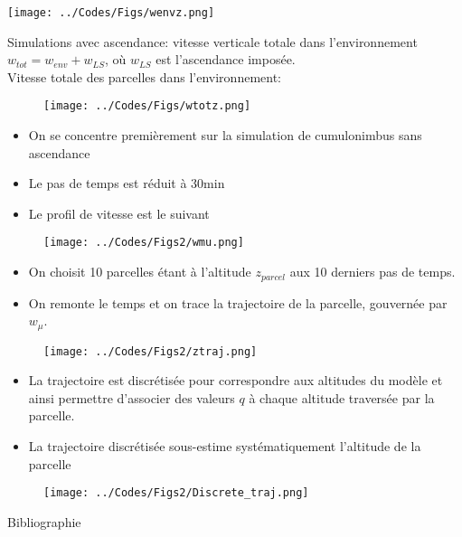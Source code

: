 \documentclass[10pt]{beamer}
\begin{document}
\begin{frame}{\secname}
    \centering
    \texttt{[image: ../Codes/Figs/wenvz.png]}
\end{frame}

\begin{frame}{\secname}
    Simulations avec ascendance: vitesse verticale totale dans l'environnement $w_{tot} = w_{env} + w_{LS}$, où $w_{LS}$ est l'ascendance imposée. \\
    Vitesse totale des parcelles dans l'environnement:
    
    \begin{figure}[hbtp]
        \centering
        \texttt{[image: ../Codes/Figs/wtotz.png]}
    \end{figure}
\end{frame}

\begin{frame}{\secname}
    \begin{itemize}
        \item On se concentre premièrement sur la simulation de cumulonimbus sans ascendance
        \item Le pas de temps est réduit à 30min
        \item Le profil de vitesse est le suivant
    \end{itemize}
    \begin{figure}[hbtp]
        \centering
        \texttt{[image: ../Codes/Figs2/wmu.png]}
    \end{figure}
\end{frame}

\begin{frame}{\secname}
    \begin{itemize}
        \item On choisit 10 parcelles étant à l'altitude $z_{parcel}$ aux 10 derniers pas de temps. 
        \item On remonte le temps et on trace la trajectoire de la parcelle, gouvernée par $w_{\mu}$.
    \end{itemize}
    \begin{figure}[hbtp]
        \centering
        \texttt{[image: ../Codes/Figs2/ztraj.png]}
    \end{figure}
\end{frame}

\begin{frame}{\secname}
    \begin{itemize}
        \item La trajectoire est discrétisée pour correspondre aux altitudes du modèle et ainsi permettre d'associer des valeurs $q$ à chaque altitude traversée par la parcelle. 
        \item La trajectoire discrétisée sous-estime systématiquement l'altitude de la parcelle
    \end{itemize}
    \begin{figure}[hbtp]
        \centering
        \texttt{[image: ../Codes/Figs2/Discrete\_traj.png]}
    \end{figure}
\end{frame}

\begin{frame}{Bibliographie}
    \printbibliography
\end{frame}
\end{document}
